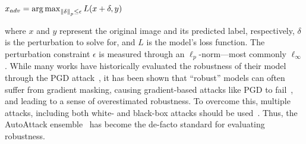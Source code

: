 \begin{center}
    $x_{adv} = \operatorname*{arg\,max}_{\left \| \delta \right \|_{p}\leq\epsilon} L(x + \delta, y)$
\end{center}

where $x$ and $y$ represent the original image and its predicted label, respectively, $\delta$ is the perturbation to solve for, and $L$ is the model's loss function. The perturbation constraint $\epsilon$ is measured through an $\ell_p$-norm---most commonly $\ell_\infty$. While many works have historically evaluated the robustness of their model through the PGD attack~\cite{madry_towards_2019}, it has been shown that ``robust'' models can often suffer from gradient masking, causing gradient-based attacks like PGD to fail~\cite{athalye_obfuscated_2018}, and leading to a sense of overestimated robustness. To overcome this, multiple attacks, including both white- and black-box attacks should be used~\cite{carlini_evaluating_2019}. Thus, the  AutoAttack ensemble~\cite{croce_reliable_2020} has become the de-facto standard for evaluating robustness.



